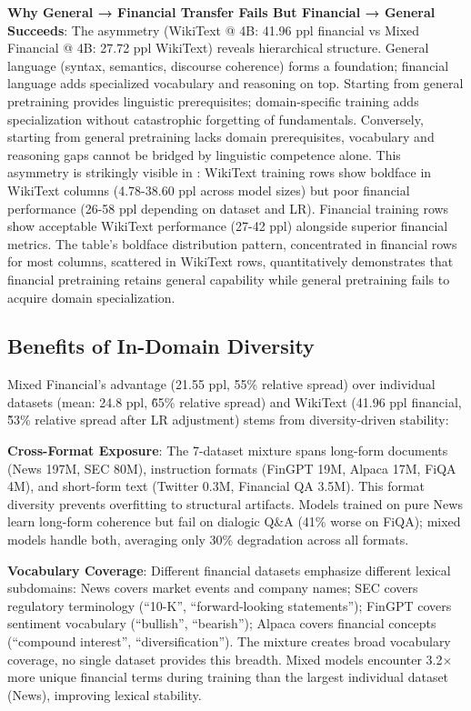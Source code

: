 \textbf{Why General → Financial Transfer Fails But Financial → General Succeeds}: The asymmetry (WikiText @ 4B: 41.96 ppl financial vs Mixed Financial @ 4B: 27.72 ppl WikiText) reveals hierarchical structure. General language (syntax, semantics, discourse coherence) forms a foundation; financial language adds specialized vocabulary and reasoning on top. Starting from general pretraining provides linguistic prerequisites; domain-specific training adds specialization without catastrophic forgetting of fundamentals. Conversely, starting from general pretraining lacks domain prerequisites, vocabulary and reasoning gaps cannot be bridged by linguistic competence alone. This asymmetry is strikingly visible in : WikiText training rows show boldface in WikiText columns (4.78-38.60 ppl across model sizes) but poor financial performance (26-58 ppl depending on dataset and LR). Financial training rows show acceptable WikiText performance (27-42 ppl) alongside superior financial metrics. The table's boldface distribution pattern, concentrated in financial rows for most columns, scattered in WikiText rows, quantitatively demonstrates that financial pretraining retains general capability while general pretraining fails to acquire domain specialization.

\subsection{Benefits of In-Domain Diversity}

Mixed Financial's advantage (21.55 ppl, 55\% relative spread) over individual datasets (mean: 24.8 ppl, \~65\% relative spread) and WikiText (41.96 ppl financial, \~53\% relative spread after LR adjustment) stems from diversity-driven stability:

\textbf{Cross-Format Exposure}: The 7-dataset mixture spans long-form documents (News 197M, SEC 80M), instruction formats (FinGPT 19M, Alpaca 17M, FiQA 4M), and short-form text (Twitter 0.3M, Financial QA 3.5M). This format diversity prevents overfitting to structural artifacts. Models trained on pure News learn long-form coherence but fail on dialogic Q\&A (41\% worse on FiQA); mixed models handle both, averaging only 30\% degradation across all formats.

\textbf{Vocabulary Coverage}: Different financial datasets emphasize different lexical subdomains: News covers market events and company names; SEC covers regulatory terminology (``10-K'', ``forward-looking statements''); FinGPT covers sentiment vocabulary (``bullish'', ``bearish''); Alpaca covers financial concepts (``compound interest'', ``diversification''). The mixture creates broad vocabulary coverage, no single dataset provides this breadth. Mixed models encounter 3.2$\times$ more unique financial terms during training than the largest individual dataset (News), improving lexical stability.

